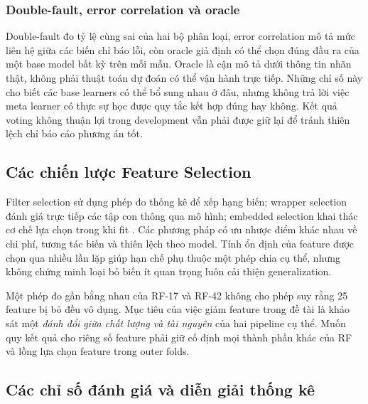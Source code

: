 \subsubsection{Double-fault, error correlation và oracle}
Double-fault đo tỷ lệ cùng sai của hai bộ phân loại, error correlation mô tả mức liên hệ giữa các biến chỉ báo lỗi, còn oracle giả định có thể chọn đúng đầu ra của một base model bất kỳ trên mỗi mẫu. Oracle là cận mô tả dưới thông tin nhãn thật, không phải thuật toán dự đoán có thể vận hành trực tiếp. Những chỉ số này cho biết các base learners có thể bổ sung nhau ở đâu, nhưng không trả lời việc meta learner có thực sự học được quy tắc kết hợp đúng hay không. Kết quả voting không thuận lợi trong development vẫn phải được giữ lại để tránh thiên lệch chỉ báo cáo phương án tốt.

\subsection{Các chiến lược Feature Selection}
Filter selection sử dụng phép đo thống kê để xếp hạng biến; wrapper selection đánh giá trực tiếp các tập con thông qua mô hình; embedded selection khai thác cơ chế lựa chọn trong khi fit \cite{legacyL08,legacyL12}. Các phương pháp có ưu nhược điểm khác nhau về chi phí, tương tác biến và thiên lệch theo model. Tính ổn định của feature được chọn qua nhiều lần lặp giúp hạn chế phụ thuộc một phép chia cụ thể, nhưng không chứng minh loại bỏ biến ít quan trọng luôn cải thiện generalization.

Một phép đo gần bằng nhau của RF-17 và RF-42 không cho phép suy rằng 25 feature bị bỏ đều vô dụng. Mục tiêu của việc giảm feature trong đề tài là khảo sát một \emph{đánh đổi giữa chất lượng và tài nguyên} của hai pipeline cụ thể. Muốn quy kết quả cho riêng số feature phải giữ cố định mọi thành phần khác của RF và lồng lựa chọn feature trong outer folds.

\subsection{Các chỉ số đánh giá và diễn giải thống kê}
